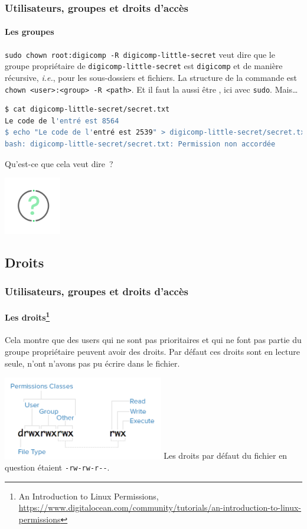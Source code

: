 \documentclass{beamer}
\begin{document}
    \begin{frame}[fragile]
        \transdissolve
        \frametitle{Utilisateurs, groupes et droits d'accès}
        \framesubtitle{Les groupes}
        \lstinline{sudo chown root:digicomp -R digicomp-little-secret} veut dire que le groupe propriétaire de \lstinline{digicomp-little-secret} est \lstinline{digicomp} et de manière récursive, \textit{i.e.}, pour les sous-dossiers et fichiers.
        La structure de la commande est \lstinline{chown <user>:<group> -R <path>}.
        Et il faut la aussi être , ici avec \lstinline{sudo}.
        \bigbreak
        Mais\ldots
        \begin{lstlisting}[language=bash]
$ cat digicomp-little-secret/secret.txt
Le code de l'entré est 8564
$ echo "Le code de l'entré est 2539" > digicomp-little-secret/secret.txt
bash: digicomp-little-secret/secret.txt: Permission non accordée
        \end{lstlisting}
        Qu'est-ce que cela veut dire~?
        \begin{center}
            \includegraphics[width=2.5cm]{image/question-mark}
        \end{center}
    \end{frame}

    \subsection{Droits}\label{subsec:droits}

    \begin{frame}
        \transdissolve
        \frametitle{Utilisateurs, groupes et droits d'accès}
        \framesubtitle{Les droits\footnote{\label{rights-digitalocean}An Introduction to Linux Permissions, \url{https://www.digitalocean.com/community/tutorials/an-introduction-to-linux-permissions}}}
        \begin{dangercolorbox}
            Cela montre que des users qui ne sont pas prioritaires et qui ne font pas partie du groupe propriétaire peuvent avoir des droits.
            Par défaut ces droits sont en lecture seule, n'ont n'avons pas pu écrire dans le fichier.
        \end{dangercolorbox}
        \centering
        \includegraphics[width=7cm]{image/permission-classes}
        \flushleft
        Les droits par défaut du fichier en question étaient \lstinline{-rw-rw-r--}.
    \end{frame}
\end{document}
